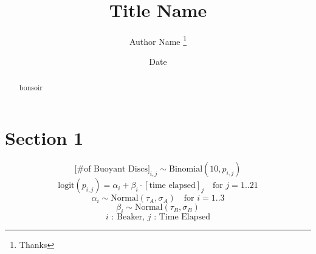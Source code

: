 \documentclass[12pt]{article}
\title{Title Name}
\author{Author Name \thanks{Thanks}}
\date{Date}
\begin{document}
\maketitle

\begin{abstract}
bonsoir
\end{abstract}

\section{Section 1}

$$ \text{[\# of Buoyant Discs]}_{i,j} \sim \text{Binomial}(10, p_{i,j}) $$
$$ \text{logit}(p_{i,j}) = \alpha_i + \beta_i \cdot [\text{time elapsed}]_j \quad \text{for } j = 1..21 $$
$$ \alpha_i \sim \text{Normal}(\tau_A, \sigma_A) \quad \text{for } i = 1..3$$
$$ \beta_i \sim \text{Normal}(\tau_B, \sigma_B)$$
$$ \text{$i$ : Beaker, $j$ : Time Elapsed} $$
\end{document}
